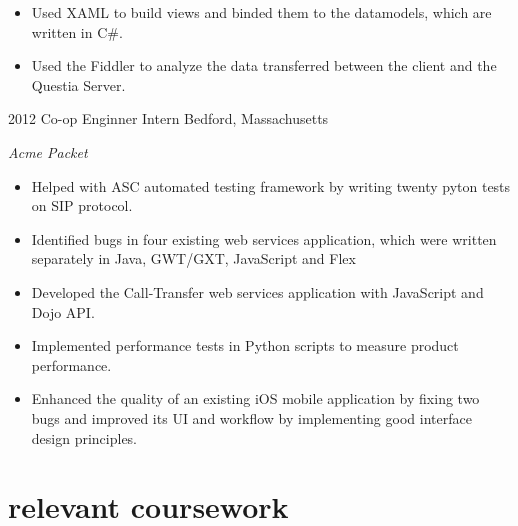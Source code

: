 \documentclass[]{ly-cv} %
\begin{document}
\begin{entrylist}
{\begin{itemize}
  \item Used XAML to build views and binded them to the datamodels, which are written in C\#.
  \item Used the Fiddler to analyze the data transferred between the client and the Questia Server.
\end{itemize}}
\entry
{2012}
{Co-op Enginner Intern}
{Bedford, Massachusetts}
{\emph{Acme Packet}
\begin{itemize}
  \item Helped with ASC automated testing framework by writing twenty pyton tests on SIP protocol.
	\item Identified bugs in four existing web services application, which were written separately in Java, GWT/GXT, JavaScript and Flex
  \item Developed the Call-Transfer web services application with JavaScript and Dojo API.
	\item Implemented performance tests in Python scripts to measure product performance.
  \item Enhanced the quality of an existing iOS mobile application by fixing two bugs and improved its UI and workflow by implementing good interface design principles.
\end{itemize}}

\end{entrylist}


\section{relevant coursework}
\end{document}
